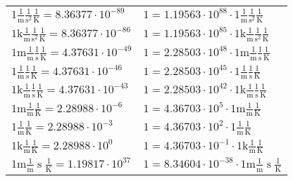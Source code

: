 \begin{center}
\begin{longtable}{l l}
{\color{black}$1 \bm{\mathrm{ }}\frac1{\operatorname{m}}\frac1{\operatorname{s}^2}{}\frac1{\operatorname{K}} = 8.36377\cdot10^{-89} $}   & {\color{black}$ 1 = 1.19563\cdot10^{88} \cdot 1 \bm{\mathrm{ }}\frac1{\operatorname{m}}\frac1{\operatorname{s}^2}{}\frac1{\operatorname{K}}$}  \\
{\color{gray}$1 \bm{\mathrm{ k}}\frac1{\operatorname{m}}\frac1{\operatorname{s}^2}{}\frac1{\operatorname{K}} = 8.36377\cdot10^{-86} $}   & {\color{gray}$ 1 = 1.19563\cdot10^{85} \cdot 1 \bm{\mathrm{ k}}\frac1{\operatorname{m}}\frac1{\operatorname{s}^2}{}\frac1{\operatorname{K}}$}  \\
{\color{gray}$1 \bm{\mathrm{ m}}\frac1{\operatorname{m}}\frac1{\operatorname{s}}{}\frac1{\operatorname{K}} = 4.37631\cdot10^{-49} $}   & {\color{gray}$ 1 = 2.28503\cdot10^{48} \cdot 1 \bm{\mathrm{ m}}\frac1{\operatorname{m}}\frac1{\operatorname{s}}{}\frac1{\operatorname{K}}$}  \\
{\color{black}$1 \bm{\mathrm{ }}\frac1{\operatorname{m}}\frac1{\operatorname{s}}{}\frac1{\operatorname{K}} = 4.37631\cdot10^{-46} $}   & {\color{black}$ 1 = 2.28503\cdot10^{45} \cdot 1 \bm{\mathrm{ }}\frac1{\operatorname{m}}\frac1{\operatorname{s}}{}\frac1{\operatorname{K}}$}  \\
{\color{gray}$1 \bm{\mathrm{ k}}\frac1{\operatorname{m}}\frac1{\operatorname{s}}{}\frac1{\operatorname{K}} = 4.37631\cdot10^{-43} $}   & {\color{gray}$ 1 = 2.28503\cdot10^{42} \cdot 1 \bm{\mathrm{ k}}\frac1{\operatorname{m}}\frac1{\operatorname{s}}{}\frac1{\operatorname{K}}$}  \\
{\color{gray}$1 \bm{\mathrm{ m}}\frac1{\operatorname{m}}{}{}\frac1{\operatorname{K}} = 2.28988\cdot10^{-6} $}   & {\color{gray}$ 1 = 4.36703\cdot10^{5} \cdot 1 \bm{\mathrm{ m}}\frac1{\operatorname{m}}{}{}\frac1{\operatorname{K}}$}  \\
{\color{black}$1 \bm{\mathrm{ }}\frac1{\operatorname{m}}{}{}\frac1{\operatorname{K}} = 2.28988\cdot10^{-3} $}   & {\color{black}$ 1 = 4.36703\cdot10^{2} \cdot 1 \bm{\mathrm{ }}\frac1{\operatorname{m}}{}{}\frac1{\operatorname{K}}$}  \\
{\color{gray}$1 \bm{\mathrm{ k}}\frac1{\operatorname{m}}{}{}\frac1{\operatorname{K}} = 2.28988\cdot10^{0} $}   & {\color{gray}$ 1 = 4.36703\cdot10^{-1} \cdot 1 \bm{\mathrm{ k}}\frac1{\operatorname{m}}{}{}\frac1{\operatorname{K}}$}  \\
{\color{gray}$1 \bm{\mathrm{ m}}\frac1{\operatorname{m}}{\operatorname{s}}{}\frac1{\operatorname{K}} = 1.19817\cdot10^{37} $}   & {\color{gray}$ 1 = 8.34604\cdot10^{-38} \cdot 1 \bm{\mathrm{ m}}\frac1{\operatorname{m}}{\operatorname{s}}{}\frac1{\operatorname{K}}$}  \\

\end{longtable}
\end{center}
